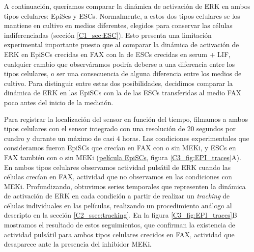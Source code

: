 \documentclass[./main.tex]{subfiles}
\begin{document}
A continuación, queríamos comparar la dinámica de activación de ERK en ambos tipos celulares: EpiScs y ESCs. Normalmente, a estos dos tipos celulares se los mantiene en cultivo en medios diferentes, elegidos para conservar las células indiferenciadas (sección \ref{C1_sec:ESC}). Esto presenta una limitación experimental importante puesto que al comparar la dinámica de activación de ERK en EpiSCs crecidas en FAX con la de ESCs crecidas en serum + LIF, cualquier cambio que observáramos podría deberse a una diferencia entre los tipos celulares, o ser una consecuencia de alguna diferencia entre los medios de cultivo. Para distinguir entre estas dos posibilidades, decidimos comparar la dinámica de ERK en las EpiSCs con la de las ESCs transferidas al medio FAX poco antes del inicio de la medición.


Para registrar la localización del sensor en función del tiempo, filmamos a ambos tipos celulares con el sensor integrado con una resolución de $20$ segundos por cuadro y durante un máximo de casi $4$ horas. Las condiciones experimentales que consideramos fueron EpiSCs que crecían en FAX con o sin MEKi, y ESCs en FAX también con o sin MEKi (\href{http://movie.biologists.com/video/10.1242/dev.199710/video-3}{\underline{película EpiSCs}}, figura \ref{C3_fig:EPI_traces}A). En ambos tipos celulares observamos actividad pulsátil de ERK cuando las células crecían en FAX, actividad que no observamos en las condiciones con MEKi. Profundizando, obtuvimos series temporales que representen la dinámica de activación de ERK en cada condición a partir de realizar un \textit{tracking} de células individuales en las películas, realizando un procedimiento análogo al descripto en la sección \ref{C2_ssec:tracking}. En la figura \ref{C3_fig:EPI_traces}B mostramos el resultado de estos seguimientos, que confirman la existencia de actividad pulsátil para ambos tipos celulares crecidos en FAX, actividad que desaparece ante la presencia del inhibidor MEKi. 
\end{document}

